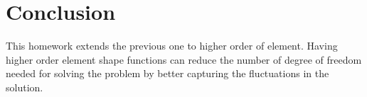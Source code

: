 \documentclass[paper=a4, fontsize=11pt]{article} %
\begin{document}


\section{Conclusion}

This homework extends the previous one to higher order of element. Having higher order element shape functions can reduce the number of degree of freedom needed for solving the problem by better capturing the fluctuations in the solution. 
\end{document}
